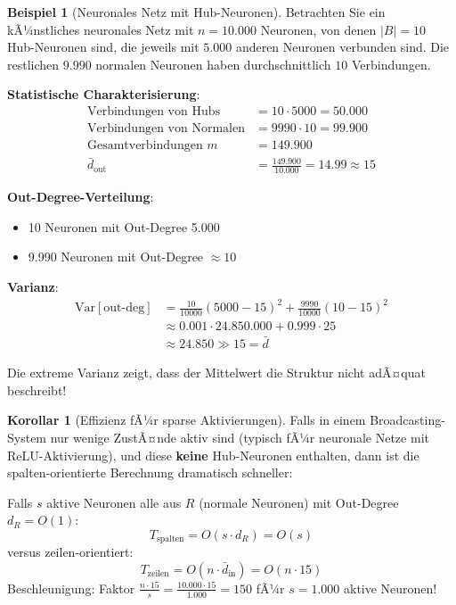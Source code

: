 ﻿\documentclass[a4paper,12pt]{report}
\theoremstyle{definition}
\newtheorem{beispiel}{Beispiel}
\newtheorem{korollar}{Korollar}
\begin{document}
	\begin{beispiel}[Neuronales Netz mit Hub-Neuronen]
		Betrachten Sie ein kÃ¼nstliches neuronales Netz mit $n = 10.000$ Neuronen, von denen $|B| = 10$ Hub-Neuronen sind, die jeweils mit $5.000$ anderen Neuronen verbunden sind. Die restlichen $9.990$ normalen Neuronen haben durchschnittlich $10$ Verbindungen.
		
		\textbf{Statistische Charakterisierung}:
		\begin{align}
			\text{Verbindungen von Hubs} &= 10 \cdot 5000 = 50.000 \\
			\text{Verbindungen von Normalen} &= 9990 \cdot 10 = 99.900 \\
			\text{Gesamtverbindungen } m &= 149.900 \\
			\bar{d}_{\text{out}} &= \frac{149.900}{10.000} = 14.99 \approx 15
		\end{align}
		
		\textbf{Out-Degree-Verteilung}:
		\begin{itemize}
			\item 10 Neuronen mit Out-Degree 5.000
			\item 9.990 Neuronen mit Out-Degree $\approx 10$
		\end{itemize}
		
		\textbf{Varianz}:
		\begin{align}
			\text{Var}[\text{out-deg}] &= \frac{10}{10000}(5000 - 15)^2 + \frac{9990}{10000}(10 - 15)^2 \\
			&\approx 0.001 \cdot 24.850.000 + 0.999 \cdot 25 \\
			&\approx 24.850 \gg 15 = \bar{d}
		\end{align}
		
		Die extreme Varianz zeigt, dass der Mittelwert die Struktur nicht adÃ¤quat beschreibt!
	\end{beispiel}
	
	\begin{korollar}[Effizienz fÃ¼r sparse Aktivierungen]
		Falls in einem Broadcasting-System nur wenige ZustÃ¤nde aktiv sind (typisch fÃ¼r neuronale Netze mit ReLU-Aktivierung), und diese \textbf{keine} Hub-Neuronen enthalten, dann ist die spalten-orientierte Berechnung dramatisch schneller:
		
		Falls $s$ aktive Neuronen alle aus $R$ (normale Neuronen) mit Out-Degree $d_R = O(1)$:
		\[
		T_{\text{spalten}} = O(s \cdot d_R) = O(s)
		\]
		versus zeilen-orientiert:
		\[
		T_{\text{zeilen}} = O(n \cdot \bar{d}_{\text{in}}) = O(n \cdot 15)
		\]
		Beschleunigung: Faktor $\frac{n \cdot 15}{s} = \frac{10.000 \cdot 15}{1.000} = 150$ fÃ¼r $s = 1.000$ aktive Neuronen!
	\end{korollar}
	
\end{document}
